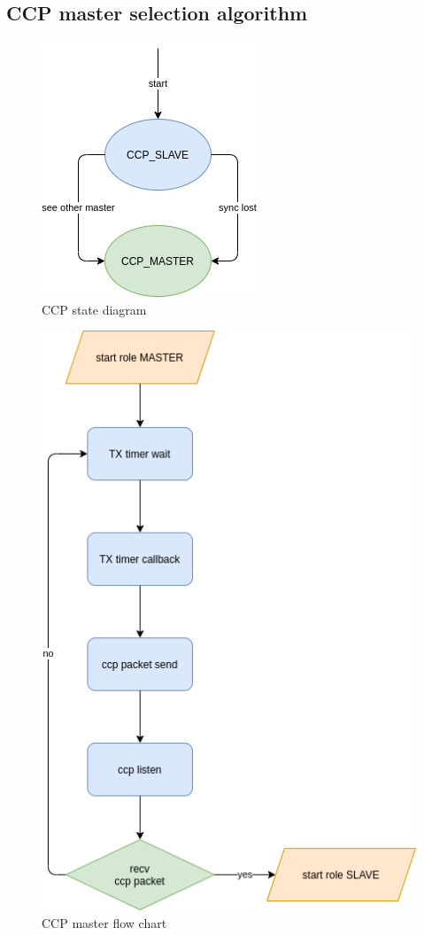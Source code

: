 \documentclass[../../main.tex]{subfiles}
\begin{document}
\subsection{CCP master selection algorithm}
\begin{figure}[H]
    \begin{center}
        \includegraphics[scale=0.6]{ccp_state_diagram.png}
    \end{center}
    \caption{CCP state diagram}
    \label{fig:CCP_state_diagram}
\end{figure}

\begin{figure}[H]
    \begin{center}
        \includegraphics[scale=0.6]{ccp_master_flow_chart.png}
    \end{center}
    \caption{CCP master flow chart}
    \label{fig:ccp_master_flow_chart}
\end{figure}
\end{document}
